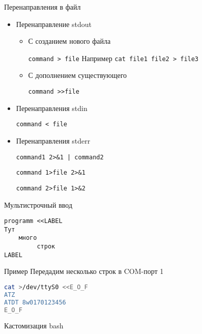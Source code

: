 \documentclass[ignorenonframetext, professionalfonts, hyperref={pdftex, unicode}]{beamer}
\begin{document}
\begin{frame}{Перенаправления в файл}
\begin{itemize}
\item Перенаправление stdout 
\begin{itemize}
\item С созданием нового файла

{\tt command > file} Например {\tt cat file1 file2 > file3}
\item С дополнением существующего

{\tt command >>file}
\end{itemize}
\pause
\item Перенаправления stdin

{\tt command < file}
\pause
\item Перенаправления stderr
 
{\tt command1 2>\&1 | command2}

{\tt command 1>file 2>\&1}

{\tt command 2>file 1>\&2}
\end{itemize}
\end{frame}

\begin{frame}[fragile]{Мультистрочный ввод}

\begin{verbatim}
programm <<LABEL
Тут
    много
	     строк
LABEL
\end{verbatim}
	
	\begin{block}{Пример}
	Передадим несколько строк в COM-порт 1
\begin{lstlisting}[language=bash]
cat >/dev/ttyS0 <<E_O_F
ATZ
ATDT 8w0170123456
E_O_F
\end{lstlisting}
	\end{block}
\end{frame}

\begin{frame}{Кастомизация bash}
\end{frame}
\end{document}
